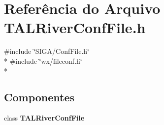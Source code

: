 \section{Referência do Arquivo T\+A\+L\+River\+Conf\+File.\+h}
\label{_t_a_l_river_conf_file_8h}
{\ttfamily \#include \char`\"{}S\+I\+G\+A/\+Conf\+File.\+h\char`\"{}}\\*
{\ttfamily \#include \char`\"{}wx/fileconf.\+h\char`\"{}}\\*
\subsection*{Componentes}
\begin{DoxyCompactItemize}
\item 
class {\bf T\+A\+L\+River\+Conf\+File}
\end{DoxyCompactItemize}
